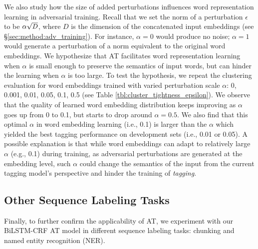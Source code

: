\documentclass[11pt,a4paper]{article}
\newcommand\scaleeq[3]{\mbox{\scalebox{#1}[#2]{$#3$}}}
\begin{document}
We also study how the size of added perturbations influences word representation learning in adversarial training.
Recall that we set the norm of a perturbation $\epsilon$ to be $\alpha \scaleeq{0.95}{0.95}{\sqrt{D}}$, where $D$ is the dimension of the concatenated input embeddings (see \S \ref{sec:method:adv_training}).
For instance, $\alpha \!=\! 0$ 
would produce no noise; $\alpha \!=\! 1$ would generate a perturbation of a norm equivalent to the original word embeddings.
We hypothesize that AT facilitates word representation learning when $\alpha$ is small enough to preserve the semantics of input words, but can hinder the learning when $\alpha$ is too large.
To test the hypothesis, we repeat the clustering evaluation for 
word embeddings trained with varied perturbation scale $\alpha$: 0, 0.001, 0.01, 0.05, 0.1, 0.5 (see Table \ref{tbl:cluster_tightness_epsilon}).
We observe that the quality of 
learned word embedding distribution keeps improving as $\alpha$ goes up from 0 to 0.1, but starts to drop around $\alpha \!=\! 0.5$.
We also find that this optimal $\alpha$ in word embedding learning (i.e., 0.1)
is larger than the $\alpha$ which yielded the best tagging performance on development sets (i.e., 0.01 or 0.05).
A possible explanation is that
while word embeddings
can adapt to relatively large $\alpha$ (e.g., 0.1) during training, as adversarial perturbations are generated at the embedding level, such $\alpha$ could change the semantics of the input from the current tagging model's perspective and hinder the training of {\it tagging}.





\subsection{Other Sequence Labeling Tasks}
\label{sec:additional_task}

Finally, to further confirm the applicability of AT, we experiment with our BiLSTM-CRF AT model in different sequence labeling tasks: chunking and named entity recognition (NER).\vspace{0.5mm}
\end{document}

